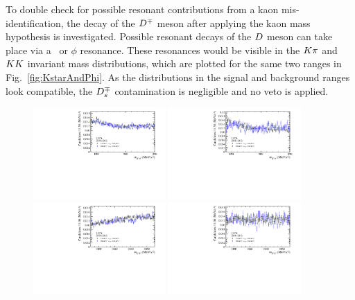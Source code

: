 %
To double check for possible resonant contributions from a kaon mis-identification, the decay
of the $D^\mp$ meson after applying the kaon mass hypothesis is investigated.
Possible resonant decays of the $D$ meson can take place via a \Kstar~or $\phi$
resonance. These resonances would be visible in the $K\pi$ and
$KK$ invariant mass distributions, which are plotted for the same two
ranges in Fig.~\ref{fig:KstarAndPhi}. As the distributions in the signal and
background ranges look compatible, the $D^{\mp}_s$ contamination is
negligible and no veto is applied.
%
\begin{figure}[t]
	\begin{center}
		\includegraphics[width=0.45\textwidth]{02Selection/figs/KstarHypo1.pdf}
		\includegraphics[width=0.45\textwidth]{02Selection/figs/KstarHypo2.pdf}\\
		\includegraphics[width=0.45\textwidth]{02Selection/figs/PhiHypo1.pdf}
		\includegraphics[width=0.45\textwidth]{02Selection/figs/PhiHypo2.pdf}

\end{center}
\end{figure}

